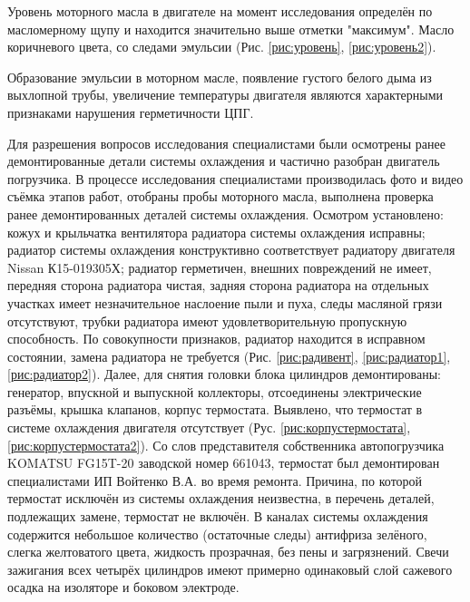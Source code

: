 
Уровень моторного масла в двигателе на момент исследования определён по масломерному щупу и находится значительно выше отметки "максимум". Масло коричневого цвета, со следами эмульсии (Рис. \ref{рис:уровень}, \ref{рис:уровень2}).

Образование эмульсии в моторном масле, появление густого белого дыма из выхлопной трубы, увеличение температуры двигателя  являются характерными признаками нарушения герметичности ЦПГ.

 Для разрешения вопросов исследования специалистами были осмотрены ранее демонтированные детали системы охлаждения и  частично разобран двигатель погрузчика. В процессе исследования специалистами производилась фото и видео съёмка этапов работ,  отобраны пробы моторного масла, выполнена проверка ранее демонтированных деталей системы охлаждения. Осмотром установлено: кожух и крыльчатка вентилятора радиатора системы охлаждения  исправны; радиатор системы охлаждения  конструктивно соответствует радиатору двигателя Nissan К15-019305Х;  радиатор герметичен,  внешних повреждений не имеет, передняя сторона радиатора чистая,  задняя сторона радиатора на отдельных участках имеет незначительное наслоение пыли и пуха,  следы масляной грязи отсутствуют,%
трубки радиатора имеют удовлетворительную пропускную способность.   По совокупности признаков, радиатор находится в исправном состоянии, замена радиатора не требуется (Рис. \ref{рис:радивент}, \ref{рис:радиатор1}, \ref{рис:радиатор2}). 
Далее, для снятия головки блока цилиндров демонтированы:  генератор, впускной и выпускной коллекторы, отсоединены электрические разъёмы, крышка клапанов,  корпус термостата. Выявлено, что термостат в системе охлаждения двигателя  отсутствует (Рус. \ref{рис:корпустермостата}, \ref{рис:корпустермостата2}). Со слов представителя собственника автопогрузчика KOMATSU FG15T-20 заводской номер 661043, термостат был демонтирован специалистами ИП Войтенко В.А. во время ремонта. Причина, по которой термостат исключён из системы охлаждения неизвестна, в перечень деталей, подлежащих замене, термостат не включён. В каналах системы охлаждения содержится небольшое количество (остаточные следы) антифриза зелёного, слегка желтоватого цвета, жидкость прозрачная, без пены и загрязнений.  Свечи зажигания всех четырёх цилиндров имеют примерно одинаковый  слой сажевого осадка на изоляторе и боковом электроде.  
